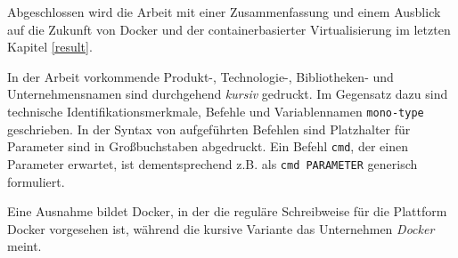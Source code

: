 \documentclass[../main.tex]{subfiles}
\begin{document}

    Abgeschlossen wird die Arbeit mit einer Zusammenfassung und einem Ausblick auf die Zukunft von Docker und der containerbasierter Virtualisierung im letzten Kapitel \ref{result}.

    In der Arbeit vorkommende Produkt-, Technologie-, Bibliotheken- und Unternehmensnamen sind durchgehend \emph{kursiv} gedruckt. Im Gegensatz dazu sind technische Identifikationsmerkmale, Befehle und Variablennamen \texttt{mono-type} geschrieben. In der Syntax von aufgeführten Befehlen sind Platzhalter für Parameter sind in Großbuchstaben abgedruckt. Ein Befehl \texttt{cmd}, der einen Parameter erwartet, ist dementsprechend z.B. als \texttt{cmd PARAMETER} generisch formuliert.

    Eine Ausnahme bildet Docker, in der die reguläre Schreibweise für die Plattform Docker vorgesehen ist, während die kursive Variante das Unternehmen \emph{Docker} meint.
\end{document}
